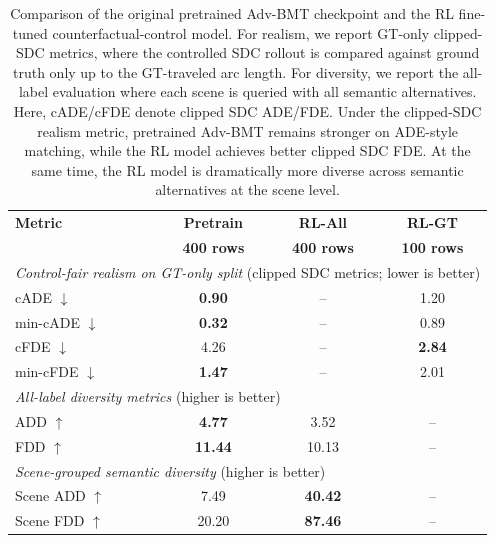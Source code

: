 \begin{table}[t]
\centering
\scriptsize
\setlength{\tabcolsep}{3.5pt}
\renewcommand{\arraystretch}{0.95}
\begin{tabular}{@{}lccc@{}}
\toprule
\textbf{Metric} &
\textbf{Pretrain} &
\textbf{RL-All} &
\textbf{RL-GT} \\
&
\textbf{400 rows} &
\textbf{400 rows} &
\textbf{100 rows} \\
\midrule
\multicolumn{4}{l}{\textit{Control-fair realism on GT-only split} (clipped SDC metrics; lower is better)} \\
cADE $\downarrow$ & \textbf{0.90} & -- & 1.20 \\
min-cADE $\downarrow$ & \textbf{0.32} & -- & 0.89 \\
cFDE $\downarrow$ & 4.26 & -- & \textbf{2.84} \\
min-cFDE $\downarrow$ & \textbf{1.47} & -- & 2.01 \\
\midrule
\multicolumn{4}{l}{\textit{All-label diversity metrics} (higher is better)} \\
ADD $\uparrow$ & \textbf{4.77} & 3.52 & -- \\
FDD $\uparrow$ & \textbf{11.44} & 10.13 & -- \\
\midrule
\multicolumn{4}{l}{\textit{Scene-grouped semantic diversity} (higher is better)} \\
Scene ADD $\uparrow$ & 7.49 & \textbf{40.42} & -- \\
Scene FDD $\uparrow$ & 20.20 & \textbf{87.46} & -- \\
\bottomrule
\end{tabular}
\caption{
Comparison of the original pretrained Adv-BMT checkpoint and the RL fine-tuned counterfactual-control model.
For realism, we report GT-only clipped-SDC metrics, where the controlled SDC rollout is compared against ground truth only up to the GT-traveled arc length.
For diversity, we report the all-label evaluation where each scene is queried with all semantic alternatives.
Here, cADE/cFDE denote clipped SDC ADE/FDE.
Under the clipped-SDC realism metric, pretrained Adv-BMT remains stronger on ADE-style matching, while the RL model achieves better clipped SDC FDE.
At the same time, the RL model is dramatically more diverse across semantic alternatives at the scene level.
}
\label{tab:pretrained_vs_rl_eval}
\end{table}
